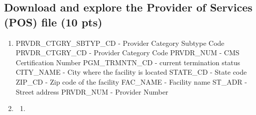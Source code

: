 \documentclass[
  letterpaper,
  DIV=11,
  numbers=noendperiod]{scrartcl}
\providecommand{\tightlist}{%
  \setlength{\itemsep}{0pt}\setlength{\parskip}{0pt}}\usepackage{longtable,booktabs,array}
\begin{document}
\subsection{Download and explore the Provider of Services (POS) file (10
pts)}\label{download-and-explore-the-provider-of-services-pos-file-10-pts}

\begin{enumerate}
\def\labelenumi{\arabic{enumi}.}
\item
  PRVDR\_CTGRY\_SBTYP\_CD - Provider Category Subtype Code
  PRVDR\_CTGRY\_CD - Provider Category Code PRVDR\_NUM - CMS
  Certification Number PGM\_TRMNTN\_CD - current termination status
  CITY\_NAME - City where the facility is located STATE\_CD - State code
  ZIP\_CD - Zip code of the facility FAC\_NAME - Facility name ST\_ADR -
  Street address PRVDR\_NUM - Provider Number
\item
  \begin{enumerate}
  \def\labelenumii{\alph{enumii}.}
  \tightlist
  \item
  \end{enumerate}
\end{enumerate}
\end{document}
